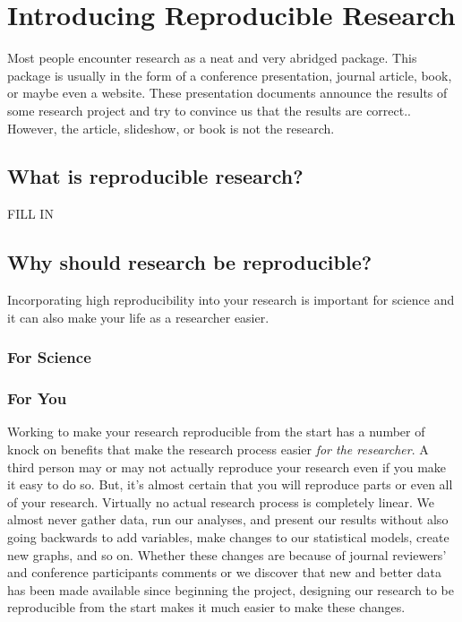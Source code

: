 \documentclass[ChapterTOCs,krantz1]{krantz}\usepackage{graphicx, color}
\begin{document}
\chapter{Introducing Reproducible Research}\label{Intro}

Most people encounter research as a neat and very abridged package. This package is usually in the form of a conference presentation, journal article, book, or maybe even a website. These presentation documents announce the results of some research project and try to convince us that the results are correct.\cite{Mesirov2010}. However, the article, slideshow, or book is not the research. 
\section{What is reproducible research?}

FILL IN

\section{Why should research be reproducible?}

Incorporating high reproducibility into your research is important for science and it can also make your life as a researcher easier. 

\subsection{For Science}

\subsection{For You}

Working to make your research reproducible from the start has a number of knock on benefits that make the research process easier {\emph{for the researcher}}. A third person may or may not actually reproduce your research even if you make it easy to do so. But, it's almost certain that you will reproduce parts or even all of your research. Virtually no actual research process is completely linear. We almost never gather data, run our analyses, and present our results without also going backwards to add variables, make changes to our statistical models, create new graphs, and so on. Whether these changes are because of journal reviewers' and conference participants comments or we discover that new and better data has been made available since beginning the project, designing our research to be reproducible from the start makes it much easier to make these changes. 
\end{document}
